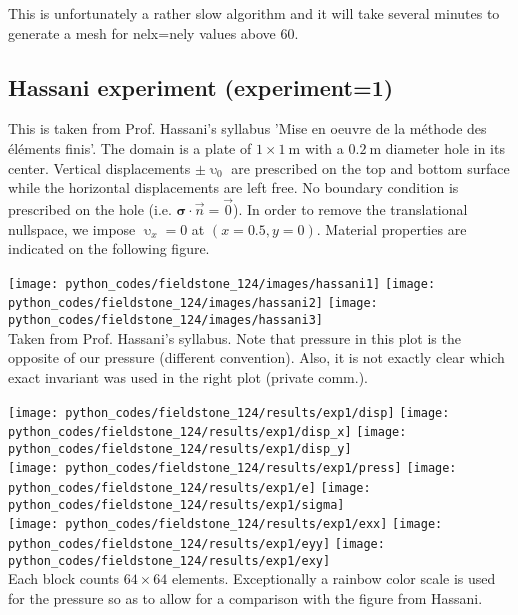 This is unfortunately a rather slow algorithm and it will take 
several minutes to generate a mesh for {\python nelx}={\python nely} values above 60.

\newpage
\subsection*{Hassani experiment (experiment=1)}

This is taken from Prof. Hassani's syllabus 'Mise en oeuvre de la m\'ethode des \'el\'ements finis'.
The domain is a plate of $1\times 1~\si{\meter}$ with a $0.2~\si{\meter}$ diameter hole in its center.
Vertical displacements $\pm \upupsilon_0$ are prescribed on the top and bottom surface while 
the horizontal displacements are left free. No boundary condition is prescribed on the hole (i.e.
${\bm \sigma}\cdot \vec{n}=\vec{0}$).
In order to remove the translational nullspace, we impose $\upupsilon_x=0$
at $(x=0.5,y=0)$. Material properties are indicated on the following figure.

\begin{center}
\texttt{[image: python\_codes/fieldstone\_124/images/hassani1]}
\texttt{[image: python\_codes/fieldstone\_124/images/hassani2]}
\texttt{[image: python\_codes/fieldstone\_124/images/hassani3]}\\
{\captionfont Taken from Prof. Hassani's syllabus. Note that pressure in this plot is the opposite 
of our pressure (different convention). Also, it is not exactly clear 
which exact invariant was used in the right plot (private comm.).}
\end{center}

\begin{center}
\texttt{[image: python\_codes/fieldstone\_124/results/exp1/disp]}
\texttt{[image: python\_codes/fieldstone\_124/results/exp1/disp\_x]}
\texttt{[image: python\_codes/fieldstone\_124/results/exp1/disp\_y]}\\
\texttt{[image: python\_codes/fieldstone\_124/results/exp1/press]}
\texttt{[image: python\_codes/fieldstone\_124/results/exp1/e]}
\texttt{[image: python\_codes/fieldstone\_124/results/exp1/sigma]}\\
\texttt{[image: python\_codes/fieldstone\_124/results/exp1/exx]}
\texttt{[image: python\_codes/fieldstone\_124/results/exp1/eyy]}
\texttt{[image: python\_codes/fieldstone\_124/results/exp1/exy]}\\
{\captionfont Each block counts $64\times 64$ elements. Exceptionally a rainbow
color scale is used for the pressure so as to allow for a comparison with 
the figure from Hassani.}
\end{center}


